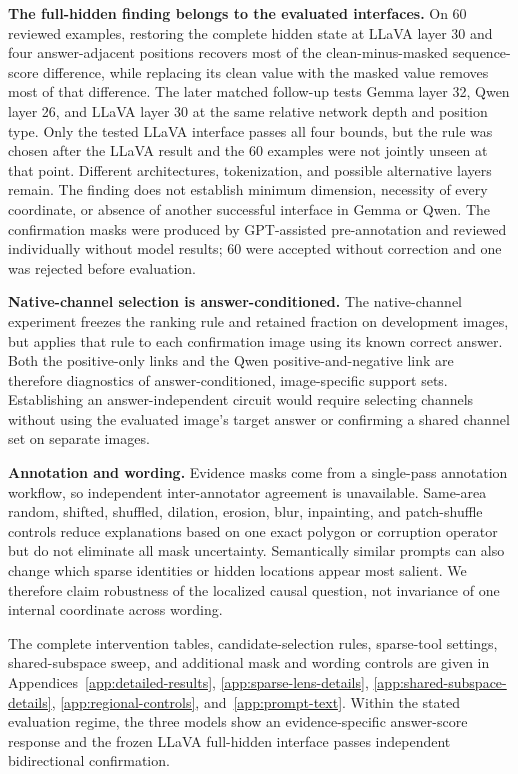 \textbf{The full-hidden finding belongs to the evaluated interfaces.} On 60 reviewed examples, restoring the complete hidden state at LLaVA layer 30 and four answer-adjacent positions recovers most of the clean-minus-masked sequence-score difference, while replacing its clean value with the masked value removes most of that difference. The later matched follow-up tests Gemma layer 32, Qwen layer 26, and LLaVA layer 30 at the same relative network depth and position type. Only the tested LLaVA interface passes all four bounds, but the rule was chosen after the LLaVA result and the 60 examples were not jointly unseen at that point. Different architectures, tokenization, and possible alternative layers remain. The finding does not establish minimum dimension, necessity of every coordinate, or absence of another successful interface in Gemma or Qwen. The confirmation masks were produced by GPT-assisted pre-annotation and reviewed individually without model results; 60 were accepted without correction and one was rejected before evaluation.

\textbf{Native-channel selection is answer-conditioned.} The native-channel experiment freezes the ranking rule and retained fraction on development images, but applies that rule to each confirmation image using its known correct answer. Both the positive-only links and the Qwen positive-and-negative link are therefore diagnostics of answer-conditioned, image-specific support sets. Establishing an answer-independent circuit would require selecting channels without using the evaluated image's target answer or confirming a shared channel set on separate images.

\textbf{Annotation and wording.} Evidence masks come from a single-pass annotation workflow, so independent inter-annotator agreement is unavailable. Same-area random, shifted, shuffled, dilation, erosion, blur, inpainting, and patch-shuffle controls reduce explanations based on one exact polygon or corruption operator but do not eliminate all mask uncertainty. Semantically similar prompts can also change which sparse identities or hidden locations appear most salient. We therefore claim robustness of the localized causal question, not invariance of one internal coordinate across wording.

The complete intervention tables, candidate-selection rules, sparse-tool settings, shared-subspace sweep, and additional mask and wording controls are given in Appendices~\ref{app:detailed-results}, \ref{app:sparse-lens-details}, \ref{app:shared-subspace-details}, \ref{app:regional-controls}, and~\ref{app:prompt-text}. Within the stated evaluation regime, the three models show an evidence-specific answer-score response and the frozen LLaVA full-hidden interface passes independent bidirectional confirmation.
